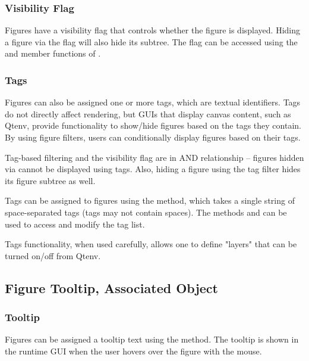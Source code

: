 \subsubsection{Visibility Flag}
\label{sec:graphics:figure-visibility-flag}

Figures have a visibility flag that controls whether the figure is displayed.
Hiding a figure via the flag will also hide its subtree. The flag can be
accessed using the  and  member functions
of .

\subsubsection{Tags}
\label{sec:graphics:figure-tags}

Figures can also be assigned one or more tags, which are textual identifiers.
Tags do not directly affect rendering, but GUIs that display canvas content,
such as Qtenv, provide functionality to show/hide figures based on the tags they
contain. By using figure filters, users can conditionally display figures based
on their tags.

Tag-based filtering and the visibility flag are in AND relationship -- figures hidden
via  cannot be displayed using tags. Also, hiding a figure
using the tag filter hides its figure subtree as well.

Tags can be assigned to figures using the 
method, which takes a single string of space-separated tags (tags may not
contain spaces). The methods  and  can
be used to access and modify the tag list.

Tags functionality, when used carefully, allows one to define "layers"
that can be turned on/off from Qtenv.



\subsection{Figure Tooltip, Associated Object}
\label{sec:graphics:figure-tooltip-associated-object}

\subsubsection{Tooltip}
\label{sec:graphics:figure-tooltip}

Figures can be assigned a tooltip text using the  method.
The tooltip is shown in the runtime GUI when the user hovers over the figure
with the mouse.

